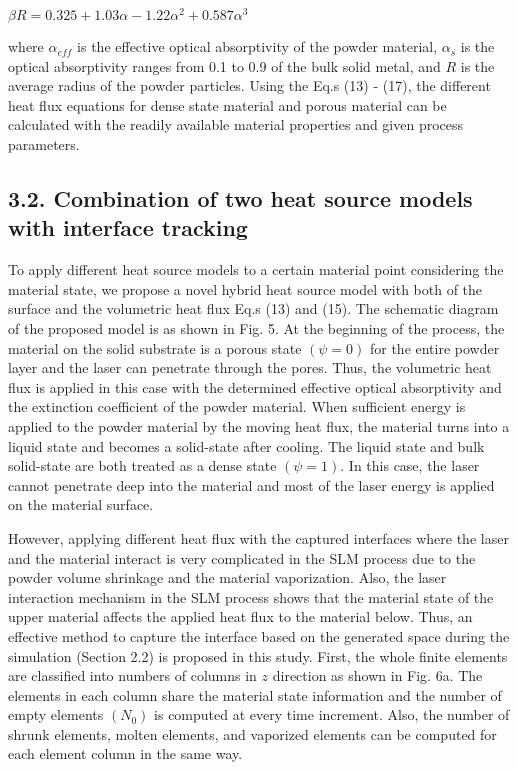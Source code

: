 \documentclass[10pt]{article}
\begin{document}
$\beta R=0.325+1.03 \alpha-1.22 \alpha^{2}+0.587 \alpha^{3}$

where $\alpha_{e f f}$ is the effective optical absorptivity of the powder material, $\alpha_{s}$ is the optical absorptivity ranges from 0.1 to 0.9 of the bulk solid metal, and $R$ is the average radius of the powder particles. Using the Eq.s (13) - (17), the different heat flux equations for dense state material and porous material can be calculated with the readily available material properties and given process parameters.

\subsection*{3.2. Combination of two heat source models with interface tracking}
To apply different heat source models to a certain material point considering the material state, we propose a novel hybrid heat source model with both of the surface and the volumetric heat flux Eq.s (13) and (15). The schematic diagram of the proposed model is as shown in Fig. 5. At the beginning of the process, the material on the solid substrate is a porous state $(\psi=0)$ for the entire powder layer and the laser can penetrate through the pores. Thus, the volumetric heat flux is applied in this case with the determined effective optical absorptivity and the extinction coefficient of the powder material. When sufficient energy is applied to the powder material by the moving heat flux, the material turns into a liquid state and becomes a solid-state after cooling. The liquid state and bulk solid-state are both treated as a dense state $(\psi=1)$. In this case, the laser cannot penetrate deep into the material and most of the laser energy is applied on the material surface.

However, applying different heat flux with the captured interfaces where the laser and the material interact is very complicated in the SLM process due to the powder volume shrinkage and the material vaporization. Also, the laser interaction mechanism in the SLM process shows that the material state of the upper material affects the applied heat flux to the material below. Thus, an effective method to capture the interface based on the generated space during the simulation (Section 2.2) is proposed in this study. First, the whole finite elements are classified into numbers of columns in $z$ direction as shown in Fig. 6a. The elements in each column share the material state information and the number of empty elements $\left(N_{0}\right)$ is computed at every time increment. Also, the number of shrunk elements, molten elements, and vaporized elements can be computed for each element column in the same way.
\end{document}
